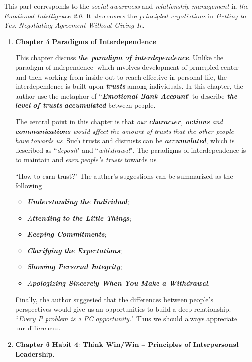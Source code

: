 \documentclass[11pt]{article}
\begin{document}
\begin{enumerate}
This part corresponds to the \emph{social awareness} and \emph{relationship management} in \emph{the Emotional Intelligence 2.0}. It also covers the \emph{principled negotiations} in \emph{Getting to Yes: Negotiating Agreement Without Giving In}.

\begin{enumerate}
\item \textbf{Chapter 5} \textbf{Paradigms of Interdependence}. 

This chapter discuss \emph{\textbf{the paradigm of interdependence}}. Unlike the paradigm of independence, which involves development of principled center and then working from inside out to reach effective in personal life, the interdependence is built upon \emph{\textbf{trusts}} among individuals. In this chapter, the author use the metaphor of ``\emph{\textbf{Emotional Bank Account}}" to describe \emph{\textbf{the level of trusts}} \emph{\textbf{accumulated}} between people. 

The central point in this chapter is that \emph{our \textbf{character}, \textbf{actions} and \textbf{communications} would affect the amount of trusts that the other people have towards us}. Such trusts and distrusts can be \emph{\textbf{accumulated}}, which is described as ``\emph{deposit}" and ``\emph{withdrawal}". The paradigms of interdependence is to maintain and \emph{earn people's trusts} towards us. 

``How to earn trust?" The author's suggestions can be summarized as the following 
\begin{itemize}
\item \emph{\textbf{Understanding the Individual}};
\item \emph{\textbf{Attending to the Little Things}};
\item \emph{\textbf{Keeping Commitments}};
\item \emph{\textbf{Clarifying the Expectations}};
\item \emph{\textbf{Showing Personal Integrity}};
\item \emph{\textbf{Apologizing Sincerely When You Make a Withdrawal}}.
\end{itemize} 

Finally, the author suggested that the differences between people's perspectives would give us an opportunities to build a deep relationship. ``\emph{Every P problem is a PC opportunity.}" Thus we should always appreciate our differences.

\item \textbf{Chapter 6} \textbf{Habit 4: Think Win/Win -- Principles of Interpersonal Leadership}. 


\end{enumerate}
\end{enumerate}
\end{document}

